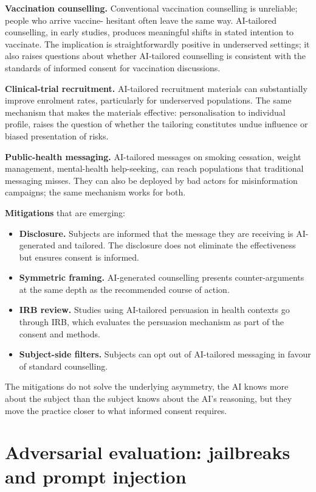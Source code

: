 \documentclass[
  letterpaper,
  11pt]{scrbook}
\providecommand{\tightlist}{%
  \setlength{\itemsep}{0pt}\setlength{\parskip}{0pt}}
\begin{document}
\textbf{Vaccination counselling.} Conventional vaccination counselling
is unreliable; people who arrive vaccine- hesitant often leave the same
way. AI-tailored counselling, in early studies, produces meaningful
shifts in stated intention to vaccinate. The implication is
straightforwardly positive in underserved settings; it also raises
questions about whether AI-tailored counselling is consistent with the
standards of informed consent for vaccination discussions.

\textbf{Clinical-trial recruitment.} AI-tailored recruitment materials
can substantially improve enrolment rates, particularly for underserved
populations. The same mechanism that makes the materials effective:
personalisation to individual profile, raises the question of whether
the tailoring constitutes undue influence or biased presentation of
risks.

\textbf{Public-health messaging.} AI-tailored messages on smoking
cessation, weight management, mental-health help-seeking, can reach
populations that traditional messaging misses. They can also be deployed
by bad actors for misinformation campaigns; the same mechanism works for
both.

\textbf{Mitigations} that are emerging:

\begin{itemize}
\tightlist
\item
  \textbf{Disclosure.} Subjects are informed that the message they are
  receiving is AI-generated and tailored. The disclosure does not
  eliminate the effectiveness but ensures consent is informed.
\item
  \textbf{Symmetric framing.} AI-generated counselling presents
  counter-arguments at the same depth as the recommended course of
  action.
\item
  \textbf{IRB review.} Studies using AI-tailored persuasion in health
  contexts go through IRB, which evaluates the persuasion mechanism as
  part of the consent and methods.
\item
  \textbf{Subject-side filters.} Subjects can opt out of AI-tailored
  messaging in favour of standard counselling.
\end{itemize}

The mitigations do not solve the underlying asymmetry, the AI knows more
about the subject than the subject knows about the AI's reasoning, but
they move the practice closer to what informed consent requires.

\section{Adversarial evaluation: jailbreaks and prompt
injection}\label{adversarial-evaluation-jailbreaks-and-prompt-injection}
\end{document}
